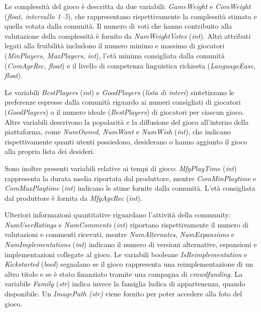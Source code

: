 \documentclass[10pt,twocolumn]{article}
\begin{document}
\smallskip
Le complessità del gioco è descritta da due variabili: \textit{GameWeight} e \textit{ComWeight} (\textit{float, intervallo 1--5}), che rappresentano rispettivamente la complessità stimata e quella votata dalla comunità. 
Il numero di voti che hanno contribuito alla valutazione della complessità è fornito da \textit{NumWeightVotes} (\textit{int}). 
Altri attributi legati alla fruibilità includono il numero minimo e massimo di giocatori (\textit{MinPlayers, MaxPlayers, int}), l’età minima consigliata dalla comunità (\textit{ComAgeRec, float}) e il livello di competenza linguistica richiesta (\textit{LanguageEase, float}). 

\smallskip
Le variabili \textit{BestPlayers} (\textit{int}) e \textit{GoodPlayers} (\textit{lista di interi}) sintetizzano le preferenze espresse dalla comunità riguardo ai numeri consigliati di giocatori (\textit{GoodPlayers}) o il numero ideale  (\textit{BestPlayers}) di giocatori per ciascun gioco. 
Altre variabili descrivono la popolarità e la diffusione del gioco all’interno della piattaforma, come \textit{NumOwned}, \textit{NumWant} e \textit{NumWish} (\textit{int}), che indicano rispettivamente quanti utenti possiedono, desiderano o hanno aggiunto il gioco alla propria lista dei desideri.

\smallskip
Sono inoltre presenti variabili relative ai tempi di gioco: \textit{MfgPlayTime} (\textit{int}) rappresenta la durata media riportata dal produttore, mentre \textit{ComMinPlaytime} e \textit{ComMaxPlaytime} (\textit{int}) indicano le stime fornite dalla comunità. 
L’età consigliata dal produttore è fornita da \textit{MfgAgeRec} (\textit{int}). 

\smallskip
Ulteriori informazioni quantitative riguardano l’attività della community: \textit{NumUserRatings} e \textit{NumComments} (\textit{int}) riportano rispettivamente il numero di valutazioni e commenti ricevuti, mentre \textit{NumAlternates}, \textit{NumExpansions} e \textit{NumImplementations} (\textit{int}) indicano il numero di versioni alternative, espansioni e implementazioni collegate al gioco. 
Le variabili booleane \textit{IsReimplementation} e \textit{Kickstarted} (\textit{bool}) segnalano se il gioco rappresenta una reimplementazione di un altro titolo e se è stato finanziato tramite una campagna di \textit{crowdfunding}. 
La variabile \textit{Family} (\textit{str}) indica invece la famiglia ludica di appartenenza, quando disponibile. Un \textit{ImagePath (str)} viene fornito per poter accedere alla foto del gioco.
\end{document}
